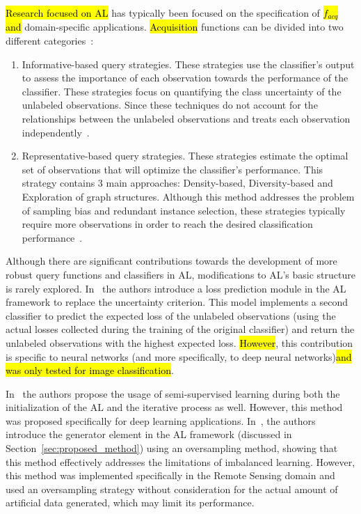 \documentclass[preprint, 12pt]{elsarticle}
\begin{document}
\hl{Research focused on AL} has typically been focused on the
specification of \hl{$f_{acq}$ and} domain-specific
applications. \hl{Acquisition} functions can be divided into two different
categories~\cite{Gu2021, Kumar2020}: 

\begin{enumerate}

    \item Informative-based query strategies. These strategies use the
        classifier's output to assess the importance of each observation
        towards the performance of the classifier. These strategies focus on
        quantifying the class uncertainty of the unlabeled observations.
        Since these techniques do not account for the relationships between
        the unlabeled observations and treats each observation
        independently~\cite{Fu2013}.

    \item Representative-based query strategies. These strategies estimate the
        optimal set of observations that will optimize the classifier's
        performance. This strategy contains 3 main approaches: Density-based,
        Diversity-based and Exploration of graph structures. Although this
        method addresses the problem of sampling bias and redundant instance
        selection, these strategies typically require more observations in
        order to reach the desired classification
        performance~\cite{Kumar2020}.

\end{enumerate}

Although there are significant contributions towards the development of more
robust query functions and classifiers in AL, modifications to AL's basic
structure is rarely explored. In~\cite{Yoo2019} the authors introduce a loss
prediction module in the AL framework to replace the uncertainty criterion.
This model implements a second classifier to predict the expected loss of the
unlabeled observations (using the actual losses collected during the training
of the original classifier) and return the unlabeled observations with the
highest expected loss. \hl{However}, this contribution is specific to neural
networks (and more specifically, to deep neural networks)\hl{and was only tested
for image classification}.

\pagebreak

In~\cite{Simeoni2020} the authors propose the usage of semi-supervised
learning during both the initialization of the AL and the iterative process as
well. However, this method was proposed specifically for deep learning
applications. In~\cite{Fonseca2021}, the authors introduce the generator
element in the AL framework (discussed in Section~\ref{sec:proposed_method})
using an oversampling method, showing that this method effectively addresses
the limitations of imbalanced learning. However, this method was implemented
specifically in the Remote Sensing domain and used an oversampling strategy
without consideration for the actual amount of artificial data generated,
which may limit its performance.
 
\end{document}
